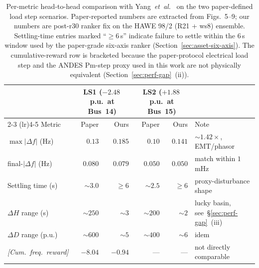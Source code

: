 \documentclass{unnc-fyp}
\begin{document}
\begin{table}[!htb]
  \centering
  \small
  \caption{Per-metric head-to-head comparison with
           Yang~\emph{et~al.}~\cite{yang2023ddic} on the two
           paper-defined load step scenarios. Paper-reported numbers
           are extracted from \cite{yang2023ddic} Figs.~5--9; our
           numbers are post-r30 ranker fix on the HAWE 98/2 (R21 +
           ws8) ensemble.
           Settling-time entries marked ``$\geq 6$\,s'' indicate
           failure to settle within the $6$\,s window used by the
           paper-grade six-axis ranker
           (Section~\ref{sec:asset-six-axis}). The cumulative-reward
           row is bracketed because the paper-protocol electrical
           load step and the ANDES Pm-step proxy used in this work
           are not physically equivalent
           (Section~\ref{sec:perf-gap}~(ii)).}
  \label{tab:s2-paper-headtohead}
  \begin{tabular}{@{}l rr@{\hskip 1.0em} rr@{\hskip 1.0em} l@{}}
    \toprule
      & \multicolumn{2}{c}{LS1 ($-2.48$\,p.u.\ at Bus~14)}
      & \multicolumn{2}{c}{LS2 ($+1.88$\,p.u.\ at Bus~15)}
      & \\
    \cmidrule(lr){2-3} \cmidrule(lr){4-5}
    Metric & Paper & Ours & Paper & Ours & Note \\
    \midrule
    $\max|\Delta f|$ (Hz)
      & $0.13$  & $0.185$
      & $0.10$  & $0.141$
      & $\sim 1.42\times$, EMT/phasor \\
    final-$|\Delta f|$ (Hz)
      & $0.080$ & $0.079$
      & $0.050$ & $0.050$
      & match within $1$\,mHz \\
    Settling time (s)
      & $\sim 3.0$ & $\geq 6$
      & $\sim 2.5$ & $\geq 6$
      & proxy-disturbance shape \\
    $\Delta H$ range (s)
      & $\sim 250$ & $\sim 3$
      & $\sim 200$ & $\sim 2$
      & lucky basin, see~\S\ref{sec:perf-gap}~(iii) \\
    $\Delta D$ range (p.u.)
      & $\sim 600$ & $\sim 5$
      & $\sim 400$ & $\sim 6$
      & idem \\
    \emph{[Cum.\ freq.\ reward]}
      & $-8.04$  & $-0.94$
      & ---      & ---
      & not directly comparable \\
    \bottomrule
  \end{tabular}
\end{table}
\end{document}
